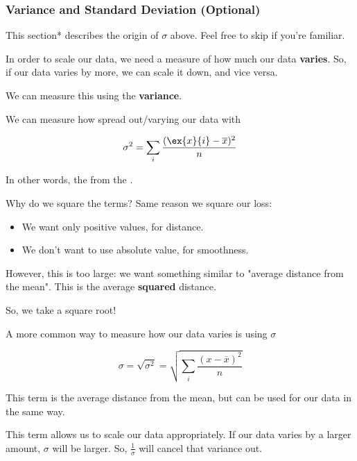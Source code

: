             \subsecdiv

            \subsubsection*{Variance and Standard Deviation (Optional)}

                This section* describes the origin of $\sigma$ above. Feel free to skip if you're familiar.

                In order to scale our data, we need a measure of how much our data \textbf{varies}. So, if our data varies by more, we can scale it down, and vice versa.

                We can measure this using the \textbf{variance}.\\

                \begin{definition}
                    We can measure how spread out/varying our data with 

                    \begin{equation}
                        \sigma^2 = \sum_i \frac{ (\ex{x}{i} - \overline{x})^2 }{n}
                    \end{equation}

                    In other words, the  from the .
                \end{definition}

                Why do we square the terms? Same reason we square our loss:

                \begin{itemize}
                    \item We want only positive values, for distance.
                    \item We don't want to use absolute value, for smoothness.
                \end{itemize}

                However, this is too large: we want something similar to "average distance from the mean". This is the average \textbf{squared} distance.

                So, we take a square root!\\

                \begin{definition}
                    A more common way to measure how our data varies is using  $\sigma$

                    \begin{equation*}
                        \sigma = \sqrt{\sigma^2}
                        = \sqrt{ \sum_i \frac{ (x - \overline{x})^2 }{n} }
                    \end{equation*}

                    This term is  the average distance from the mean, but can be used for  our data in the same way.
                \end{definition}

                This term allows us to scale our data appropriately. If our data varies by a larger amount, $\sigma$ will be larger. So, $\frac{1}{\sigma}$ will cancel that variance out.
